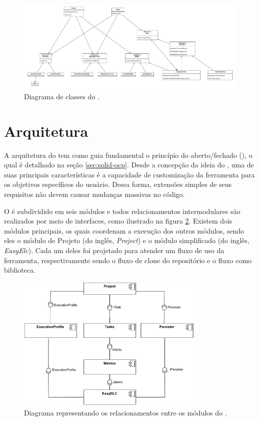 \documentclass[12pt]{tcc}
\begin{document}
	\begin{figure}[!ht]
		\centering
		\includegraphics[width=\textwidth]{figures/diagrama-classes.pdf}
		\caption{Diagrama de classes do .}
		\label{fig:diag-classes}
	\end{figure}


	\section{Arquitetura}
	\label{sec:arquitetura}

	A arquitetura do  tem como guia fundamental o princípio do aberto/fechado (), o qual é detalhado na seção \ref{sec:solid-ocp}.
	Desde a concepção da ideia do , uma de suas principais características é a capacidade de customização da ferramenta para os objetivos específicos do usuário.
	Dessa forma, extensões simples de seus requisitos não devem causar mudanças massivas no código.

	O  é subdividido em seis módulos e todos relacionamentos intermodulares são realizados por meio de interfaces, como ilustrado na figura \ref{fig:diagrama-arquitetura}.
	Existem dois módulos principais, os quais coordenam a execução dos outros módulos, sendo eles o módulo de Projeto (do inglês, \emph{Project}) e o módulo  simplificado (do inglês, \emph{EasyElc}).
	Cada um deles foi projetado para atender um fluxo de uso da ferramenta, respectivamente sendo o fluxo de clone do repositório e o fluxo como biblioteca.

	\begin{figure}[!ht]
		\centering
		\includegraphics[width=0.8\textwidth]{figures/diagramaarquiteturaelchupacabra.pdf}
		\caption{Diagrama representando os relacionamentos entre os módulos do .}
		\label{fig:diagrama-arquitetura}
	\end{figure}
	
\end{document}

